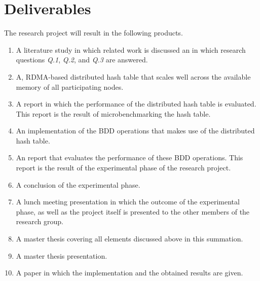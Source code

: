 \section{Deliverables}
The research project will result in the following products.

\begin{enumerate}
	\item A literature study in which related work is discussed an in which research questions \textit{Q.1}, \textit{Q.2}, and \textit{Q.3} are answered.
	\item A, RDMA-based distributed hash table that scales well across the available memory of all participating nodes.
	\item A report in which the performance of the distributed hash table is evaluated. This report is the result of microbenchmarking the hash table.
	\item An implementation of the BDD operations that makes use of the distributed hash table.
	\item An report that evaluates the performance of these BDD operations. This report is the result of the experimental phase of the research project.
	\item A conclusion of the experimental phase.
	\item A lunch meeting presentation in which the outcome of the experimental phase, as well as the project itself is presented to the other members of the research group.
	\item A master thesis covering all elements discussed above in this summation.
	\item A master thesis presentation.
	\item A paper in which the implementation and the obtained results are given.
\end{enumerate}